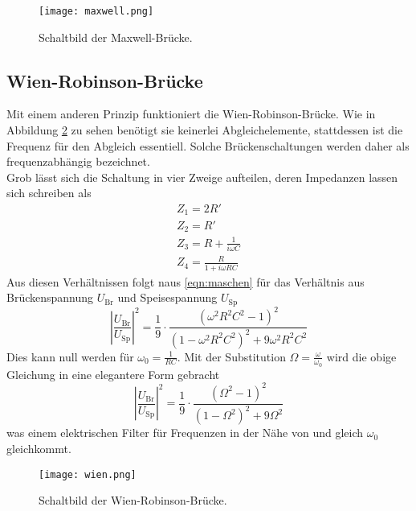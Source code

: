     \begin{figure}
        \centering
        \texttt{[image: maxwell.png]}
        \caption{Schaltbild der Maxwell-Brücke.}
        \label{fig:maxwell}
    \end{figure}

\subsection{Wien-Robinson-Brücke}
    Mit einem anderen Prinzip funktioniert die Wien-Robinson-Brücke. Wie in Abbildung \ref{fig:wien} zu sehen benötigt sie keinerlei Abgleichelemente,
    stattdessen ist die Frequenz für den Abgleich essentiell. Solche Brückenschaltungen werden daher als frequenzabhängig bezeichnet.\\
    Grob lässt sich die Schaltung in vier Zweige aufteilen, deren Impedanzen lassen sich schreiben als
    \begin{align}
        Z_1 = 2 R'\\
        Z_2 = R'\\
        Z_3 = R + \frac{1}{i \omega C}\\
        Z_4 = \frac{R}{1 + i \omega R C}
    \end{align}
    Aus diesen Verhältnissen folgt naus \eqref{eqn:maschen} für das Verhältnis aus Brückenspannung $U_{\text{Br}}$ und Speisespannung $U_{\text{Sp}}$
    \begin{equation}
        \left| \frac{U_{\text{Br}}}{U_{\text{Sp}}} \right|^2 = \frac{1}{9} \cdot \frac{\left(\omega^2 R^2 C^2 - 1\right)^2}{\left(1 - \omega^2 R^2 C^2\right)^2 + 9 \omega^2 R^2 C^2}
    \end{equation}
    Dies kann null werden für $\omega_0 = \frac{1}{RC}$. Mit der Substitution $\Omega = \frac{\omega}{\omega_0}$ wird die obige Gleichung in eine elegantere 
    Form gebracht
    \begin{equation}
        \left| \frac{U_{\text{Br}}}{U_{\text{Sp}}} \right|^2 = \frac{1}{9} \cdot \frac{\left(\Omega^2 - 1\right)^2}{\left(1 - \Omega^2\right)^2 + 9 \Omega^2}
    \end{equation}
    was einem elektrischen Filter für Frequenzen in der Nähe von und gleich $\omega_0$ gleichkommt.

    \begin{figure}
        \centering
        \texttt{[image: wien.png]}
        \caption{Schaltbild der Wien-Robinson-Brücke.}
        \label{fig:wien}
    \end{figure}
